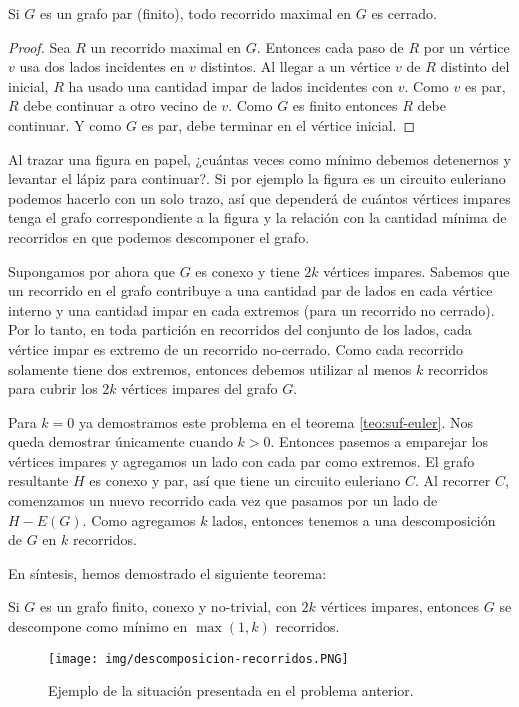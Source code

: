 \begin{lem}
    Si $G$ es un grafo par (finito), todo recorrido maximal en $G$ es cerrado.
\end{lem}

\begin{proof}
    Sea $R$ un recorrido maximal en $G$. Entonces cada paso de $R$ por un vértice $v$ usa dos lados incidentes en $v$ distintos. Al llegar a un vértice $v$ de $R$ distinto del inicial, $R$ ha usado una cantidad impar de lados incidentes con $v$. Como $v$ es par, $R$ debe continuar a otro vecino de $v$. Como $G$ es finito entonces $R$ debe continuar. Y como $G$ es par, debe terminar en el vértice inicial.
\end{proof}

\begin{prob}
    Al trazar una figura en papel, ¿cuántas veces como mínimo debemos detenernos y levantar el lápiz para continuar?. Si por ejemplo la figura es un circuito euleriano podemos hacerlo con un solo trazo, así que dependerá de cuántos vértices impares tenga el grafo correspondiente a la figura y la relación con la cantidad mínima de recorridos en que podemos descomponer el grafo.
    
    Supongamos por ahora que $G$ es conexo y tiene $2k$ vértices impares. Sabemos que un recorrido en el grafo contribuye a una cantidad par de lados en cada vértice interno y una cantidad impar en cada extremos (para un recorrido no cerrado). Por lo tanto, en toda partición en recorridos del conjunto de los lados, cada vértice impar es extremo de un recorrido no-cerrado. Como cada recorrido solamente tiene dos extremos, entonces debemos utilizar al menos $k$ recorridos para cubrir los $2k$ vértices impares del grafo $G$.
    
    Para $k = 0$ ya demostramos este problema en el teorema \ref{teo:suf-euler}. Nos queda demostrar únicamente cuando $k > 0$. Entonces pasemos a emparejar los vértices impares y agregamos un lado con cada par como extremos. El grafo resultante $H$ es conexo y par, así que tiene un circuito euleriano $C$. Al recorrer $C$, comenzamos un nuevo recorrido cada vez que pasamos por un lado de $H - E(G)$. Como agregamos $k$ lados, entonces tenemos a una descomposición de $G$ en $k$ recorridos.
\end{prob}

En síntesis, hemos demostrado el siguiente teorema:

\begin{teo}
    Si $G$ es un grafo finito, conexo y no-trivial, con $2k$ vértices impares, entonces $G$ se descompone como mínimo en $\max(1,k)$ recorridos.
\end{teo}

\begin{figure} %
    \centering
    \texttt{[image: img/descomposicion-recorridos.PNG]}
    \caption{Ejemplo de la situación presentada en el problema anterior.}
\end{figure}